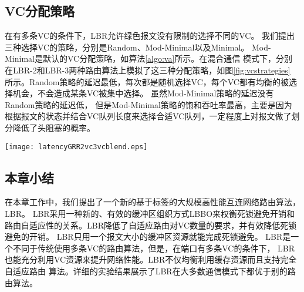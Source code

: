   \subsection{VC分配策略}

  在有多条VC的条件下，LBR允许绿色报文没有限制的选择不同的VC。
  我们提出三种选择VC的策略，分别是Random、Mod-Minimal以及Minimal。
  Mod-Minimal是默认的VC分配策略，如算法\ref{algo:va}所示。在混合通信
  模式下，分别在LBR-2和LBR-3两种路由算法上模拟了这三种分配策略，如图\ref{fig:vcstrategies}
  所示。Random策略的延迟最低，每次都是随机选择VC，每个VC都有均衡的被选择机会，不会造成某条VC被集中选择。
  虽然Mod-Minimal策略的延迟没有Random策略的延迟低，
  但是Mod-Minimal策略的饱和吞吐率最高，主要是因为
  根据报文的状态并结合VC队列长度来选择合适VC队列，一定程度上对报文做了划分降低了头阻塞的概率。


    \begin{figure*}[t]
     \centering
    \texttt{[image: latencyGRR2vc3vcblend.eps]}
  \caption{混合通信模式下VC分配策略性能比较}
  \label{fig:vcstrategies}

\end{figure*}


  \subsection{本章小结}

  在本章工作中，我们提出了一个新的基于标签的大规模高性能互连网络路由算法，LBR。
  LBR采用一种新的、有效的缓冲区组织方式LBBO来权衡死锁避免开销和路由自适应性的关系。LBR降低了自适应路由对VC数量的要求，并有效降低死锁避免的开销。
  LBR只用一个报文大小的缓冲区资源就能完成死锁避免。
  LBR是一个不同于传统使用多条VC的路由算法，但是，在端口有多条VC的条件下，
  LBR也能充分利用VC资源来提升网络性能。LBR不仅均衡利用缓存资源而且支持完全自适应路由
  算法。详细的实验结果展示了LBR在大多数通信模式下都优于别的路由算法。


